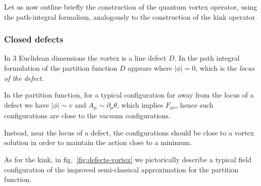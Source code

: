 \documentclass[../main/main.tex]{subfiles}
\begin{document}
Let us now outline briefly the construction of the quantum vortex operator, using the path-integral formalism, analogously to the construction of the kink operator. 

\subsubsection{Closed defects}

In 3 Euclidean dimensions the vortex is a line defect $D$. In the path integral formulation of the partition function $D$ appears where $|\phi|=0$, which is the \emph{locus of the defect}. 

In the partition function, for a typical configuration far away from the locus of a defect we have $|\phi|\sim v$ and $A_\mu\sim\partial_\mu\theta$, which implies $F_{\mu\nu}$, hence such configurations are close to the vacuum configurations. 

Instead, near the locus of a defect, the configurations should be close to a vortex solution in order to maintain the action close to a minimum. 

As for the kink, in fig.~\ref{fig:defects-vortex} we pictorically describe a typical field configuration of the improved semi-classical approximation for the partition function. 
\end{document}
